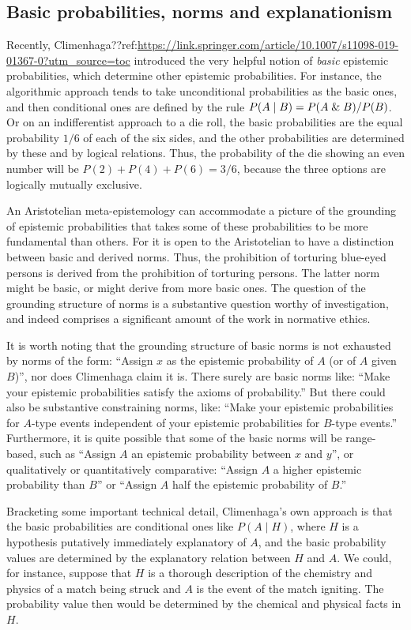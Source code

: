 \subsection{Basic probabilities, norms and explanationism}
Recently, Climenhaga??ref:\url{https://link.springer.com/article/10.1007/s11098-019-01367-0?utm_source=toc} introduced the 
very helpful notion 
of \textit{basic} epistemic probabilities, which determine other epistemic probabilities. For instance, the 
algorithmic approach tends to take unconditional probabilities as the basic ones, and then conditional ones are 
defined by the rule $P(A\mid B)=P(A\mathrel{\&} B)/P(B)$. Or on an indifferentist approach to a die roll, the basic 
probabilities are the equal probability $1/6$ of each of the six sides, and the other probabilities are determined
by these and by logical relations. Thus, the probability of the die showing an even number will be $P(2)+P(4)+P(6)=3/6$,
because the three options are logically mutually exclusive. 

An Aristotelian meta-epistemology can accommodate a picture of the grounding of epistemic probabilities that 
takes some of these probabilities to be more fundamental than others. For it is open to the Aristotelian to have
a distinction between basic and derived norms. Thus, the prohibition of torturing blue-eyed persons is 
derived from the prohibition of torturing persons. The latter norm might be basic, or might derive from 
more basic ones. The question of the grounding structure of norms is a substantive question worthy of 
investigation, and indeed comprises a significant amount of the work in normative ethics. 

It is worth noting that the grounding structure of basic norms is not exhausted by norms of the form:
``Assign $x$ as the epistemic probability of $A$ (or of $A$ given $B$)'', nor does Climenhaga claim it is.
There surely are basic norms like: ``Make your epistemic probabilities satisfy the axioms of probability.''
But there could also be substantive constraining norms, like: ``Make your epistemic probabilities for $A$-type 
events independent of your epistemic probabilities for $B$-type events.'' Furthermore, it is quite possible
that some of the basic norms will be range-based, such as ``Assign $A$ an epistemic probability between $x$ 
and $y$'', or qualitatively or quantitatively comparative: ``Assign $A$ a higher epistemic probability than
$B$'' or ``Assign $A$ half the epistemic probability of $B$.''

Bracketing some important technical detail, Climenhaga's own approach is that the basic probabilities are conditional 
ones like $P(A\mid H)$, where $H$ is a hypothesis putatively immediately explanatory of $A$, and the basic 
probability values are determined by the explanatory relation between $H$ and $A$. We could, for instance, 
suppose that $H$ is a thorough description of the chemistry and physics of a match being struck and $A$ 
is the event of the match igniting. The probability value then would be determined by the chemical and physical facts 
in $H$.

